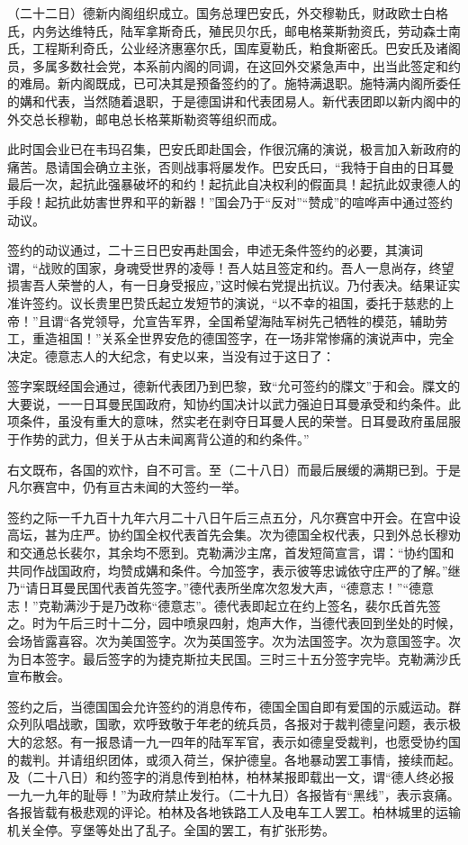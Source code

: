 （二十二日）德新内阁组织成立。国务总理巴安氏，外交穆勒氏，财政欧士白格氏，内务达维特氏，陆军拿斯奇氏，殖民贝尔氏，邮电格莱斯勃资氏，劳动森士南氏，工程斯利奇氏，公业经济惠塞尔氏，国库夏勒氏，粕食斯密氏。巴安氏及诸阁员，多属多数社会党，本系前内阁的同调，在这回外交紧急声中，出当此签定和约的难局。新内阁既成，已可决其是预备签约的了。施特满退职。施特满内阁所委任的媾和代表，当然随着退职，于是德国讲和代表团易人。新代表团即以新内阁中的外交总长穆勒，邮电总长格莱斯勒资等组织而成。

此时国会业已在韦玛召集，巴安氏即赴国会，作很沉痛的演说，极言加入新政府的痛苦。恳请国会确立主张，否则战事将屡发作。巴安氏曰，“我特于自由的日耳曼最后一次，起抗此强暴破坏的和约！起抗此自决权利的假面具！起抗此奴隶德人的手段！起抗此妨害世界和平的新器！”国会乃于“反对”“赞成”的喧哗声中通过签约动议。

签约的动议通过，二十三日巴安再赴国会，申述无条件签约的必要，其演词谓，“战败的国家，身魂受世界的凌辱！吾人姑且签定和约。吾人一息尚存，终望损害吾人荣誉的人，有一日身受报应，”这时候右党提出抗议。乃付表决。结果证实准许签约。议长贵里巴贽氏起立发短节的演说，“以不幸的祖国，委托于慈悲的上帝！”且谓“各党领导，允宣告军界，全国希望海陆军树先己牺牲的模范，辅助劳工，重造祖国！”关系全世界安危的德国签字，在一场非常惨痛的演说声中，完全决定。德意志人的大纪念，有史以来，当没有过于这日了：

签字案既经国会通过，德新代表团乃到巴黎，致“允可签约的牒文”于和会。牒文的大要说，一一日耳曼民国政府，知协约国决计以武力强迫日耳曼承受和约条件。此项条件，虽没有重大的意味，然实老在剥夺日耳曼人民的荣誉。日耳曼政府虽屈服于作势的武力，但关于从古未闻离背公道的和约条件。”

右文既布，各国的欢忭，自不可言。至（二十八日）而最后展缓的满期已到。于是凡尔赛宫中，仍有亘古未闻的大签约一举。

签约之际一千九百十九年六月二十八日午后三点五分，凡尔赛宫中开会。在宫中设高坛，甚为庄严。协约国全权代表首先会集。次为德国全权代表，只到外总长穆劝和交通总长裴尔，其余均不愿到。克勒满沙主席，首发短简宣言，谓：“协约国和共同作战国政府，均赞成媾和条件。今加签字，表示彼等忠诚依守庄严的了解。”继乃“请日耳曼民国代表首先签字。”德代表所坐席次忽发大声，“德意志！”“德意志！”克勒满沙于是乃改称“德意志”。德代表即起立在约上签名，裴尔氏首先签之。时为午后三时十二分，园中喷泉四射，炮声大作，当德代表回到坐处的时候，会场皆露喜容。次为美国签字。次为英国签字。次为法国签字。次为意国签字。次为日本签字。最后签字的为捷克斯拉夫民国。三时三十五分签字完毕。克勒满沙氏宣布散会。

签约之后，当德国国会允许签约的消息传布，德国全国自即有爱国的示威运动。群众列队唱战歌，国歌，欢呼致敬于年老的统兵员，各报对于裁判德皇问题，表示极大的忿怒。有一报恳请一九一四年的陆军军官，表示如德皇受裁判，也愿受协约国的裁判。并请组织团体，或须入荷兰，保护德皇。各地暴动罢工事情，接续而起。及（二十八日）和约签字的消息传到柏林，柏林某报即载出一文，谓“德人终必报一九一九年的耻辱！”为政府禁止发行。（二十九日）各报皆有“黑线”，表示哀痛。各报皆载有极悲观的评论。柏林及各地铁路工人及电车工人罢工。柏林城里的运输机关全停。亨堡等处出了乱子。全国的罢工，有扩张形势。

